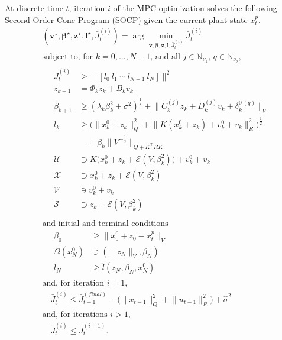 \documentclass{IEEEtran}
\theoremstyle{definition}
\theoremstyle{remark}
\begin{document}
At discrete time $t$, iteration $i$ of the MPC optimization solves the following Second Order Cone Program (SOCP) given the current plant state $x^p_t$.
\begin{align} \label{opt:mpc}%
& (\mathbf{v}^\star,\boldsymbol{\beta}^\star,\mathbf{z}^\star,\mathbf{l}^\star, \bar{J}_t^{(i)}) = 
\arg\min_{\mathbf{v},\boldsymbol{\beta},\mathbf{z},\mathbf{l},\bar{J}_t^{(i)}}\bar{J}_t^{(i)}
\\ \nonumber
& \text{subject to, for $k=0,...,N-1$, and all $j\in\mathbb{N}_{\nu_{1}}$, $q\in\mathbb{N}_{\nu_\theta}$, 
}\\  \nonumber
& \quad \begin{aligned}
\bar{J}_t^{(i)} & \geq \lVert [ l_0 \ l_1 \ \cdots \ l_{N-1} \ l_{N} ] \rVert^2 \\
z_{k+1} & = \Phi_k z_k + B_kv_k \\
\beta_{k+1} & \geq 
(\lambda_k\beta_k^2 + \sigma^2)^\frac{1}{2} + 
\lVert C^{(j)}_k z_k + D^{(j)}_k v_k + \delta^{0\,(q)}_k \rVert_V \\
l_{k} & \geq \bigl( \lVert x^0_k +z_k\rVert_Q^2 
+ \lVert K(x^0_k + z_k) + v^0_k + v_k\rVert_R^2  \bigr)^{\frac{1}{2}}
\\
& \quad + \beta_k \lVert{V}^{-\frac{1}{2}}\rVert_{Q+K^\top R K}
\\
\mathcal{U} & \supset K\bigl(x_k^0+z_k+\mathcal{E}(V,\beta_k^2)\bigr) + v_k^0 + v_k \\
\mathcal{X} & \supset x_k^0+z_k+\mathcal{E}(V,\beta_k^2) \\
\mathcal{V} & \ni v_k^0 + v_k \\
\mathcal{S} & \supset z_k+\mathcal{E}(V,\beta_k^2) \\
\end{aligned} \\ \nonumber
& \text{and initial and terminal conditions} \\ \nonumber
& \quad \begin{aligned}
\beta_0 & \geq \lVert x^0_0 + z_0 - x^p_t\rVert_V \\
\Omega(x^0_N) & \ni (\|z_N\|_V, \beta_N) \\
l_N &\geq \hat{l}(z_N, \beta_N, x^0_N )
\end{aligned} \\ \nonumber
& \text{and, for iteration $i=1$,} \\ \nonumber
& \quad \bar{J}^{(i)}_t \leq \bar{J}^{(\mathit{final})}_{t-1} - \bigl(\lVert x_{t-1} \rVert^2_Q +  \lVert u_{t-1} \rVert^2_R \bigr) + \hat{\sigma}^2 \\ \nonumber
&\text{and, for iterations $i>1$,} \\  \nonumber
& \quad \bar{J}^{(i)}_t \leq \bar{J}^{(i-1)}_t .
\end{align}
\end{document}
